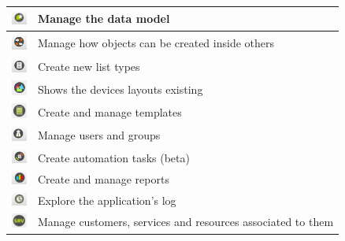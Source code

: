 \documentclass[a4paper]{article}
\begin{document}
\begin{table}[h!]
\begin{tabular}{cl}
			\midrule
			\includegraphics[width=0.5cm]{img/icon_data_model_manager.png} & Manage the data model\\
			\midrule
			\includegraphics[width=0.5cm]{img/icon_containment_manager.png} & Manage how objects can be created inside others\\
			\midrule
			\includegraphics[width=0.5cm]{img/icon_list_type_manager.png} & Create new list types\\
			\midrule
			\includegraphics[width=0.5cm]{img/icon_devices_layouts.png} & Shows the devices layouts existing\\
			\midrule
			\includegraphics[width=0.5cm]{img/icon_template_manager.png} & Create and manage templates\\
			\midrule
			\includegraphics[width=0.5cm]{img/icon_user_manager.png} & Manage users and groups\\
			\midrule
			\includegraphics[width=0.5cm]{img/icon_task_manager.png} & Create automation tasks (beta)\\
			\midrule
			\includegraphics[width=0.5cm]{img/icon_reports.png} & Create and manage reports\\
			\midrule
			\includegraphics[width=0.5cm]{img/icon_audit_trail.png} & Explore the application's log\\
			\midrule
			\includegraphics[width=0.5cm]{img/icon_service_manager.png} & Manage customers, services and resources associated to them\\

\end{tabular}
\end{table}
\end{document}
